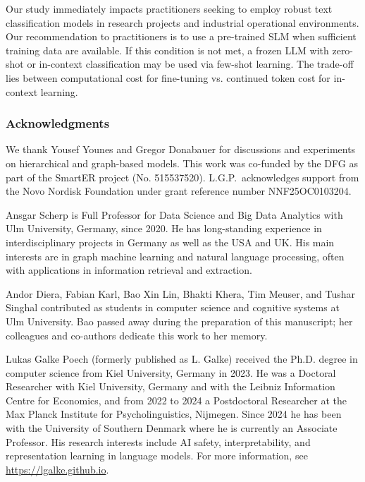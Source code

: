 \documentclass[lettersize,journal]{IEEEtran}
\newcommand{\SLM}{SLM\xspace}
\newcommand{\LLM}{LLM\xspace}
\begin{document}
Our study immediately impacts practitioners seeking to employ robust text classification models in research projects and industrial operational environments. 
Our recommendation to practitioners is to use a pre-trained \SLM when sufficient training data are available.
If this condition is not met, a frozen \LLM with zero-shot or in-context classification may be used via few-shot learning. 
The trade-off lies between computational cost for fine-tuning vs\@. continued token cost for in-context learning.

\subsubsection*{Acknowledgments}
We thank Yousef Younes and Gregor Donabauer for discussions and experiments on hierarchical and graph-based models.
This work was co-funded by the DFG as part of the SmartER project (No. 515537520). L.G.P.\ acknowledges support from the Novo Nordisk Foundation under grant reference number NNF25OC0103204.




\begin{IEEEbiographynophoto}{Ansgar Scherp} is Full Professor for Data Science and Big Data Analytics with Ulm University, Germany, since 2020. He has long-standing experience in interdisciplinary projects in Germany as well as the USA and UK. His main interests are in graph machine learning and natural language processing, often with applications in information retrieval and extraction.

\end{IEEEbiographynophoto}

\begin{IEEEbiographynophoto}{Andor Diera, Fabian Karl, Bao Xin Lin, Bhakti Khera, Tim Meuser, and Tushar Singhal} contributed as students in computer science and cognitive systems at Ulm University. Bao passed away during the preparation of this manuscript; her colleagues and co-authors dedicate this work to her memory.
\end{IEEEbiographynophoto}

\begin{IEEEbiographynophoto}{Lukas Galke Poech} 
(formerly published as L. Galke) received the Ph.D. degree in computer science from Kiel University, Germany in 2023.
He was a Doctoral Researcher with Kiel University, Germany and with the Leibniz Information Centre for Economics, and from 2022 to 2024 a Postdoctoral Researcher at the Max Planck Institute for Psycholinguistics, Nijmegen. Since 2024 he has been with the University of Southern Denmark where he is currently
an Associate Professor. His research interests include AI safety, interpretability, and representation learning in language models.
For more information, see \url{https://lgalke.github.io}.
\end{IEEEbiographynophoto}
\end{document}
